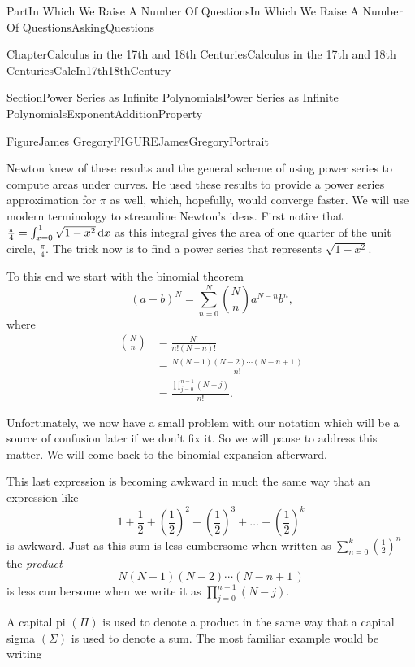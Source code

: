 \documentclass[oneside,10pt,]{book}
\numberwithin{equation}{part}
\newcommand{\dx}[1]{\,{\rm d}#1}
\newcommand{\amp}{&}
\begin{document}
\begin{partptx}{Part}{In Which We Raise A Number Of Questions}{}{In Which We Raise A Number Of Questions}{}{}{AskingQuestions}
\begin{chapterptx}{Chapter}{Calculus in the 17th and 18th Centuries}{}{Calculus in the 17th and 18th Centuries}{}{}{CalcIn17th18thCentury}
\begin{sectionptx}{Section}{Power Series as Infinite Polynomials}{}{Power Series as Infinite Polynomials}{}{}{ExponentAdditionProperty}
\begin{figureptx}{Figure}{James Gregory}{FIGUREJamesGregoryPortrait}{}
\begin{image}{0.325}{0.35}{0.325}{}
\end{image}%
\tcblower
\end{figureptx}%
 Newton knew of these results and the general scheme of using power series to compute areas under curves. He used these results to provide a power series approximation for \(\pi\) as well, which, hopefully, would converge faster.  We will use modern terminology to streamline Newton's ideas.  First notice that \(\frac{\pi}{4}=\int_{x=0}^1\sqrt{1-x^2}\dx{ x}\) as this integral gives the area of one quarter of the unit circle, \(\frac{\pi }{4}\).  The trick now is to find a power series that represents \(\sqrt{1-x^2}\).%
\par
To this end we start with the binomial theorem%
\begin{equation*}
\left(a+b\right)^N=\sum_{n=0}^N\binom{N}{n}a^{N-n}b^n\text{,}
\end{equation*}
where%
\begin{align*}
\binom{N}{n}\amp =\frac{N!}{n!\left(N-n\right)!}\\
\amp =\frac{N\left(N-1\right)\left(N-2\right)\cdots\left(N-n+1\,\right)}{n!}\\
\amp =\frac{\prod_{j=0}^{n-1}\left(N-j\right)}{n!}\text{.}
\end{align*}
%
\par
Unfortunately, we now have a small problem with our notation which will be a source of confusion later if we don't fix it.  So we will pause to address this matter.  We will come back to the binomial expansion afterward.%
\par
This last expression is becoming awkward in much the same way that an expression like%
\begin{equation*}
1+\frac{1}{2}+\left(\frac{1}{2}\right)^2+\left(\frac{1}{2}\right)^3+\ldots+\left(\frac{1}{2}\right)^k
\end{equation*}
is awkward.  Just as this sum is less cumbersome when written as \(\sum_{n=0}^k\left(\frac{1}{2}\right)^n\) the \emph{product}%
\begin{equation*}
N\left(N-1\right)\left(N-2\right)\cdots\left(N-n+1\,\right)
\end{equation*}
is less cumbersome when we write it as \(\prod_{j=0}^{n-1}\left(N-j\right)\).%
\par
A capital pi \(\left(\Pi\right)\) is used to denote a product in the same way that a capital sigma \(\left(\Sigma\right)\) is used to denote a sum.  The most familiar example would be writing%
\begin{equation*}

\end{equation*}
\end{sectionptx}
\end{chapterptx}
\end{partptx}
\end{document}
